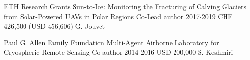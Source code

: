 \begin{cventries}
\cvgrantentry
	{ETH Research Grants} %
	{Sun-to-Ice: Monitoring the Fracturing of Calving Glaciers from Solar-Powered UAVs in Polar Regions} %
	{Co-Lead author} %
	{2017-2019} %
	{CHF 426,500 (USD 456,606)} %
	{G. Jouvet} %
	
\cvgrantentry
	{Paul G. Allen Family Foundation} %
	{Multi-Agent Airborne Laboratory for Cryospheric Remote Sensing} %
	{Co-author} %
	{2014-2016} %
	{USD 200,000} %
	{S. Keshmiri} %
    
\end{cventries}


%
